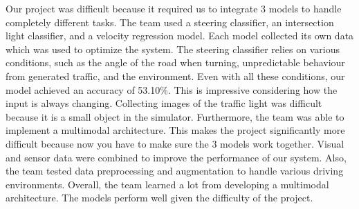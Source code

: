 \documentclass{article} %
\begin{document}
Our project was difficult because it required us to integrate 3 models to handle completely different
tasks. The team used a steering classifier, an intersection light classifier, and a velocity regression
model. Each model collected its own data which was used to optimize the system. The steering classifier
relies on various conditions, such as the angle of the road when turning, unpredictable behaviour from
generated traffic, and the environment. Even with all these conditions, our model achieved an accuracy
of 53.10\%. This is impressive considering how the input is always changing. Collecting images of the traffic light was difficult because it is a small object in the simulator.
Furthermore, the team was able to implement a multimodal architecture. This makes the project
significantly more difficult because now you have to make sure the 3 models work together. Visual and
sensor data were combined to improve the performance of our system. Also, the team tested data
preprocessing and augmentation to handle various driving environments. Overall, the team learned a lot from developing a multimodal architecture. The models perform well given
the difficulty of the project.



\label{last_page}



\end{document}
